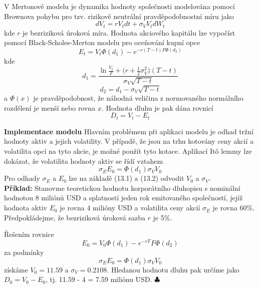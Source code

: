 \documentclass[a4paper]{book}
\begin{document}
V Mertonově modelu je dynamika hodnoty společnosti modelována pomocí Brownova pohybu pro tzv. rizikově neutrální pravděpodobnostní míru jako
\begin{equation*}
d V_t = r V_t dt + \sigma_V V_t d W_t
\end{equation*}
kde $r$ je bezriziková úroková míra. Hodnota akciového kapitálu lze vypočíst pomocí Black-Scholes-Merton modelu pro oceňování kupní opce
\begin{equation}
E_t = V_t \Phi(d_1) - e^{-r(T-t)F \Phi(d_2)}
\end{equation}
kde
\begin{equation*}
d_1 = \frac{\ln \frac{V_t}{F} + \big(r + \frac{1}{2}\sigma_V^2\big)(T - t)}{\sigma_V \sqrt{T - t}}
\end{equation*}
\begin{equation*}
d_2 = d_1 - \sigma_V \sqrt{T - t}
\end{equation*}
a $\Phi(x)$ je pravděpodobnost, že náhodná veličina z normovaného normálního rozdělení je menší nebo rovna $x$. Hodnota dluhu je pak dána rovnicí
\begin{equation*}
D_t = V_t - E_t
\end{equation*}

\noindent \textbf{Implementace modelu} Hlavním problémem při aplikaci modelu je odhad tržní hodnoty aktiv a jejich volatility. V případě, že jsou na trhu kotovány ceny akcií a volatilita opcí na tyto akcie, je možné použít tyto kotace. Aplikací It\^o lemmy lze dokázat, že volatilita hodnoty aktiv se řídí vztahem
\begin{equation}
\sigma_E E_0 = \Phi(d_1)\sigma_V V_0
\end{equation}
Pro odhady $\sigma_E$ a $E_0$ lze na základě (13.1) a (13.2) odvodit $V_0$ a $\sigma_V$.\\

\noindent \textbf{Příklad:} Stanovme teoretickou hodnotu korporátního dluhopisu s nominální hodnotou 8 miliónů USD a splatností jeden rok emitovaného společností, jejíž hodnota aktiv $E_0$ je rovna 4 milióny USD a volatilita ceny akcií $\sigma_E$ je rovna 60\%. Předpokládejme, že bezriziková úroková sazba $r$ je 5\%.

Řešením rovnice
\begin{equation*}
E_0 = V_0 \Phi(d_1) - e^{-rT}F \Phi(d_2)
\end{equation*}
za podmínky
\begin{equation*}
\sigma_E E_0 = \Phi(d_1) \sigma_V V_0
\end{equation*}
získáme $V_0 = 11.59$ a $\sigma_V = 0.2108$. Hledanou hodnotu dluhu pak určíme jako $D_0 = V_0 - E_0$, tj. 11.59 - 4 = 7.59 miliónu USD. $\clubsuit$\\
\end{document}
